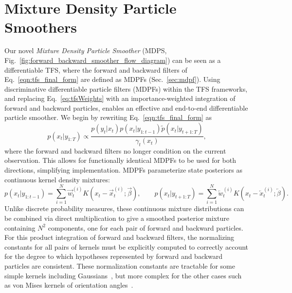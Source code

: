 


\section{Mixture Density Particle Smoothers} \label{sec:mdps}


    Our novel \emph{Mixture Density Particle Smoother} (MDPS, Fig.~\ref{fig:forward_backward_smoother_flow_diagram}) can be seen as a differentiable TFS, where the forward and backward filters of Eq.~\eqref{eqn:tfs_final_form} are defined as MDPFs (Sec.~\ref{sec:mdpf}).  Using discriminative differentiable particle filters (MDPFs) within the TFS frameworks, and replacing Eq.~\eqref{eq:tfsWeights} with an importance-weighted integration of forward and backward particles, enables an effective and end-to-end differentiable particle smoother. 
    We begin by rewriting Eq.~\eqref{eqn:tfs_final_form} as 
    \begin{equation}
        p(x_t|y_{1:T}) \propto \frac{p(y_t|x_t) p(x_t|y_{1:t-1}) \tilde{p}(x_t| y_{t+1:T})}{\gamma_t(x_t)},
        \label{eqn:mdps}
    \end{equation}
    where the forward and backward filters no longer condition on the current observation.     
    This allows for functionally identical MDPFs to be used for both directions, simplifying implementation. MDPFs parameterize state posteriors as continuous kernel density mixtures:
    \begin{equation}
        p(x_t|y_{1:t-1}) = \sum_{i=1}^{N} \overrightarrow{w}_{t}^{(i)} K(x_t - \overrightarrow{x}_{t}^{(i)}; \overrightarrow{\beta}), \quad\quad
        p(x_t|y_{t+1:T}) = \sum_{i=1}^{N} \overleftarrow{w}_{t}^{(i)} K(x_t - \overleftarrow{x}_{t}^{(i)}; \overleftarrow{\beta}).
        \label{eqn:mdps_mixture_posteriors}
    \end{equation}
    Unlike discrete probability measures, these continuous mixture distributions can be combined via direct multiplication to give a smoothed posterior mixture containing $N^2$ components, one for each pair of forward and backward particles.
    For this product integration of forward and backward filters, the normalizing constants for all pairs of kernels must be explicitly computed to correctly account for the degree to which hypotheses represented by forward and backward particles are consistent.  These normalization constants are tractable for some simple kernels including Gaussians~\cite{ihler2003efficient}, but more complex for the other cases such as von Mises kernels of orientation angles~\cite{bc1d15dd-524c-38f4-a83a-d55cfe9db0a2, 10.1145/355744.355753}.
